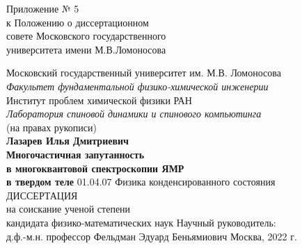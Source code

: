 \begin{titlepage}
\begin{flushright}
   Приложение № 5 \\
   к Положению о диссертационном \\
   совете Московского государственного \\
   университета имени М.В.Ломоносова
\end{flushright}
\vspace{1cm}
\begin{center}
  {\large Московский государственный университет им. М.В. Ломоносова} \\
  {\it Факультет фундаментальной физико-химической инженерии} \\
  \vspace{1cm} 
  {\large Институт проблем химической физики РАН} \\
  {\it Лаборатория спиновой динамики и спинового компьютинга} \\
  \vfill
  (на правах рукописи) \\ 
  \vfill
  {\Large \bf Лазарев Илья Дмитриевич} \\
  \vspace{1cm}
  {\Large \bf 
      Многочастичная запутанность \\
      в многоквантовой спектроскопии ЯМР \\
      \vspace{2mm}
      в твердом теле
  }
 \vfill
 01.04.07 Физика конденсированного состояния \\
 \vspace{1cm}
 ДИССЕРТАЦИЯ \\
 на соискание ученой степени \\
 кандидата физико-математических наук
 \vfill
 {\large
   Научный руководитель:\\
   д.ф.-м.н. профессор Фельдман Эдуард Беньямиович
 }
 \vfill
 Москва, 2022 г.
\end{center}
\end{titlepage}